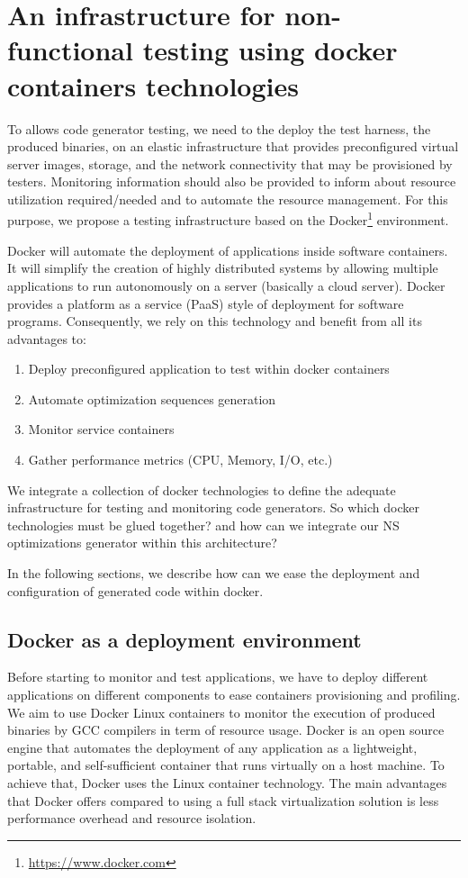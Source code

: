 \section{An infrastructure for non-functional testing using docker containers
technologies}

To allows code generator testing, we need to the deploy the test harness, \ie the produced binaries, on an elastic infrastructure that provides preconfigured virtual server images, storage, and the network connectivity that may be provisioned by testers. 
Monitoring information should also be provided to inform about resource utilization required/needed and to automate the resource management. 
For this purpose, we propose a testing infrastructure based on the Docker\footnote{\url{https://www.docker.com}} environment. 

Docker will automate the deployment of applications inside software containers. It will simplify the creation
of highly distributed systems by allowing multiple applications to run autonomously on a server
(basically a cloud server). 
Docker provides a platform as a service (PaaS) style of deployment for software programs. 
Consequently, we rely on this technology and benefit from all its advantages to:

\begin{enumerate}
	\item Deploy preconfigured application to test within docker containers
	\item Automate optimization sequences generation
	\item Monitor service containers
	\item Gather performance metrics (CPU, Memory, I/O, etc.)
\end{enumerate}

We integrate a collection of docker technologies to define the adequate infrastructure for testing and monitoring code generators. 
So which docker technologies must be glued together? and how can we integrate our NS optimizations generator within this architecture?

In the following sections, we describe how can we ease the deployment and configuration of generated code within docker.

\subsection{Docker as a deployment environment}

Before starting to monitor and test applications, we have to deploy different applications on different components to ease containers provisioning and profiling.
We aim to use Docker Linux containers to monitor the execution of produced binaries by GCC compilers in term of resource usage. 
Docker is an open source engine that automates the deployment of any application as a lightweight, portable, and self-sufficient container that runs virtually on a host machine. 
To achieve that, Docker uses the Linux container technology. 
The main advantages that Docker offers compared to using a full stack virtualization solution is less performance overhead and resource isolation.

